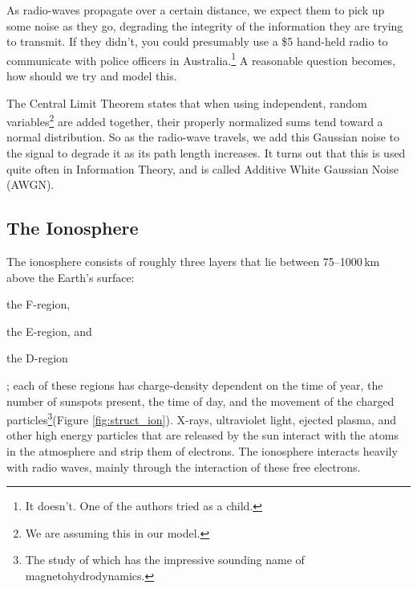 \documentclass[11pt]{article}
\numberwithin{equation}{section}
\begin{document}
As radio-waves propagate over a certain distance, we expect them to pick up some noise as they go, degrading the integrity of the information they are trying to transmit. If they didn't, you could presumably use a \$5 hand-held radio to communicate with police officers in Australia.\footnote{It doesn't. One of the authors tried as a child.} A reasonable question becomes, how should we try and model this.

The Central Limit Theorem states that when using independent, random variables\footnote{We are assuming this in our model.} are added together, their properly normalized sums tend toward a normal distribution.\cite{central} So as the radio-wave travels, we add this Gaussian noise to the signal to degrade it as its path length increases. It turns out that this is used quite often in Information Theory, and is called Additive White Gaussian Noise (AWGN).\cite{shannon1984communication,kailath1968innovations}


\subsection{The Ionosphere} %
\label{sub:the_ionosphere}

The ionosphere consists of roughly three layers that lie between 75--1000\,km above the Earth's surface:
\begin{enumerate*}[(1)]
    \item the F-region,
    \item the E-region, and
    \item the D-region
\end{enumerate*}; each of these regions has charge-density dependent on the time of year, the number of sunspots present, the time of day, and the movement of the charged particles\footnote{The study of which has the impressive sounding name of magnetohydrodynamics.}(Figure \ref{fig:struct_ion}). X-rays, ultraviolet light, ejected plasma, and other high energy particles that are released by the sun interact with the atoms in the atmosphere and strip them of electrons.\cite{noauthor_tracking_nodate} The ionosphere interacts heavily with radio waves, mainly through the interaction of these free electrons.\cite{budden1961radio}
\end{document}
